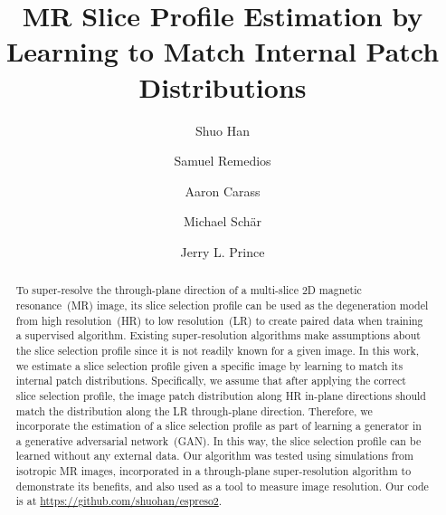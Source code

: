 \documentclass[runningheads]{llncs}
\begin{document}
%
\title{MR Slice Profile Estimation by Learning to Match Internal Patch
Distributions}



%
%
\author{Shuo Han
\and Samuel Remedios
\and Aaron Carass
\and Michael Sch\"{a}r 
\and Jerry L. Prince }


%

\maketitle
%
\begin{abstract}
%
To super-resolve the through-plane direction of a multi-slice 2D
magnetic resonance~(MR) image, its slice selection profile can be used
as the degeneration model from high resolution~(HR) to low
resolution~(LR) to create paired data when training a supervised
algorithm. Existing super-resolution algorithms make assumptions about
the slice selection profile since it is not readily known for a given
image. In this work, we estimate a slice selection profile given a
specific image by learning to match its internal patch distributions.
Specifically, we assume that after applying the correct slice
selection profile, the image patch distribution along HR in-plane
directions should match the distribution along the LR through-plane
direction. Therefore, we incorporate the estimation of a slice
selection profile as part of learning a generator in a generative
adversarial network~(GAN). In this way, the slice selection profile
can be learned without any external data. Our algorithm was tested
using simulations from isotropic MR images, incorporated in a
through-plane super-resolution algorithm to demonstrate its benefits,
and also used as a tool to measure image resolution. Our code is at
\url{https://github.com/shuohan/espreso2}.
%
%
\end{abstract}
%
%
\end{document}
